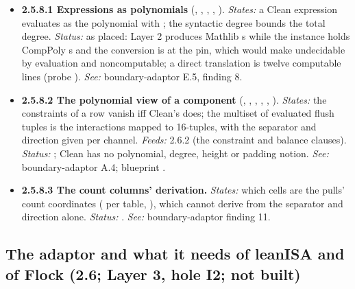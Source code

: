 \begin{itemize}[label={}, leftmargin=1.3em, itemindent=-1.3em, labelwidth=0pt, labelsep=0pt, itemsep=4pt, topsep=3pt]
\item {}\label{obl:node-2.5.8.1}\oblflag\textbf{2.5.8.1 Expressions as polynomials} (, , , , ). \emph{States:} a Clean expression evaluates as the polynomial with ; the syntactic degree bounds the total degree. \emph{Status:}   as placed: Layer 2 produces Mathlib s while the instance holds CompPoly s and the conversion is  at the pin, which would make  undecidable by evaluation and  noncomputable; a direct translation is twelve computable lines (probe ). \emph{See:} boundary-adaptor E.5, finding 8.
\item {}\label{obl:node-2.5.8.2}\textbf{2.5.8.2 The polynomial view of a component} (, , , , , ). \emph{States:} the constraints of a row vanish iff Clean's  does; the multiset of evaluated flush tuples is the interactions mapped to 16-tuples, with the separator and direction given per channel. \emph{Feeds:} 2.6.2 (the constraint and balance clauses). \emph{Status:} ; Clean has no polynomial, degree, height or padding notion. \emph{See:} boundary-adaptor A.4; blueprint .
\item {}\label{obl:node-2.5.8.3}\oblflag\textbf{2.5.8.3 The count columns' derivation.} \emph{States:} which cells are the pulls' count coordinates ( per table, ), which  cannot derive from the separator and direction alone. \emph{Status:}  . \emph{See:} boundary-adaptor finding 11.
\end{itemize}

\subsection[The adaptor (2.6)]{The adaptor and what it needs of leanISA and of Flock (2.6; Layer 3, hole I2; not built)}\label{sec:obl-tier-adaptor}

